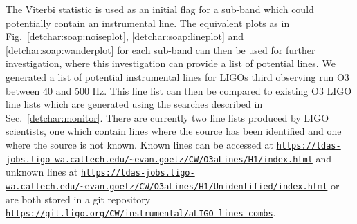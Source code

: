 \clearpage

The Viterbi statistic is used as an initial flag for a sub-band which could potentially contain an instrumental line.
The equivalent plots as in Fig.~\ref{detchar:soap:noiseplot}, \ref{detchar:soap:lineplot} and
\ref{detchar:soap:wanderplot} for each sub-band can then be used for further investigation, where this investigation can provide a list of potential lines. 
We generated a list of potential instrumental lines for \glspl{LIGO} third observing run O3 between 40 and 500 Hz.
This line list can then be compared to existing O3 \gls{LIGO} line lists which are generated using the searches described in Sec.~\ref{detchar:monitor}.
There are currently two line lists produced by \gls{LIGO} scientists, one which contain lines where the source has been identified and one where the source is not known.
Known lines can be accessed at {\tt \url{https://ldas-jobs.ligo-wa.caltech.edu/~evan.goetz/CW/O3aLines/H1/index.html}}
and unknown lines at {\tt \url{https://ldas-jobs.ligo-wa.caltech.edu/~evan.goetz/CW/O3aLines/H1/Unidentified/index.html}} or are both stored in a git repository {\tt \url{https://git.ligo.org/CW/instrumental/aLIGO-lines-combs}}. 

